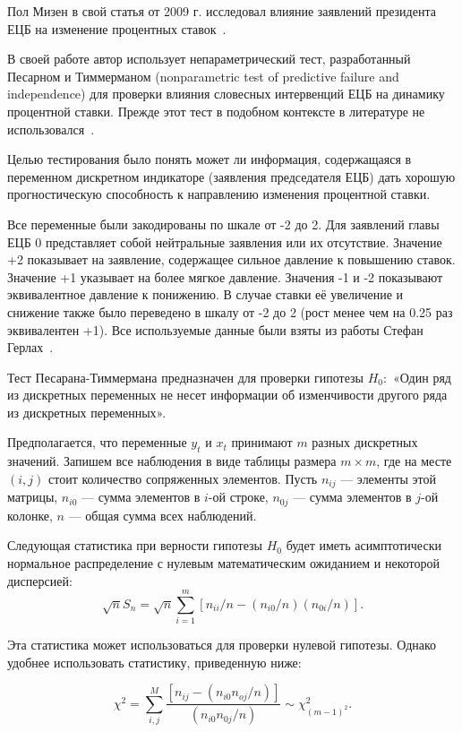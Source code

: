 \documentclass[14pt,a4paper, oneside]{extreport}
\begin{document}
Пол Мизен в свой статья от 2009 г. исследовал влияние заявлений президента ЕЦБ на изменение процентных ставок~\cite{mizen2009can}.

В своей работе автор использует непараметрический тест, разработанный Песарном и Тиммерманом (nonparametric test of predictive failure and independence) для проверки влияния словесных интервенций ЕЦБ на динамику процентной ставки. Прежде этот тест в подобном контексте в литературе не использовался~\cite{pesaran2000recursive}. \label{P_T}

Целью тестирования было понять может ли информация, содержащаяся в переменном дискретном индикаторе (заявления председателя ЕЦБ) дать хорошую прогностическую способность к направлению изменения процентной ставки. 

Все переменные были закодированы по шкале от -2 до 2. Для заявлений главы ЕЦБ 0 представляет собой нейтральные заявления или их отсутствие. Значение +2 показывает на заявление, содержащее сильное давление к повышению ставок.
Значение +1 указывает на более мягкое давление. Значения -1 и -2 показывают эквивалентное давление к понижению. В случае ставки её увеличение и снижение также было переведено в шкалу от -2 до 2 (рост менее чем на 0.25 раз эквивалентен +1). Все используемые данные были взяты из работы 
Стефан Герлах~\cite{gerlach2007interest}.

Тест Песарана-Тиммермана предназначен для проверки гипотезы $H_0:$ «Один ряд из дискретных переменных не несет информации об изменчивости другого ряда из дискретных переменных».

Предполагается, что  переменные $y_t$ и $x_t$ принимают $m$  разных дискретных значений. Запишем все наблюдения в виде таблицы размера $m \times m$, где на месте $(i,j)$ стоит количество сопряженных элементов. Пусть $n_{ij}$ --- элементы этой матрицы, $n_{i0}$ ---   сумма элементов в $i$-ой строке, $n_{0j}$ --- сумма элементов в $j$-ой колонке, $n$ --- общая сумма всех наблюдений. 

Следующая статистика при верности гипотезы $H_0$ будет иметь асимптотически нормальное распределение с нулевым математическим ожиданием и некоторой дисперсией:
\begin{equation} 
\sqrt{n} S_n = \sqrt{n} \sum_{i=1}^m [n_{ii}/n-(n_{i0}/n)(n_{0i}/n)].
\end{equation}

Эта статистика может использоваться для проверки нулевой гипотезы. Однако удобнее использовать статистику, приведенную ниже:

\begin{equation}
\chi^2 = \sum_{i,j}^M \frac{[n_{ij}-(n_{i0}n_{oj}/n)]}{(n_{i0}n_{0j}/n)} \sim \chi^2_{(m-1)^2}.
\end{equation}
\end{document}
